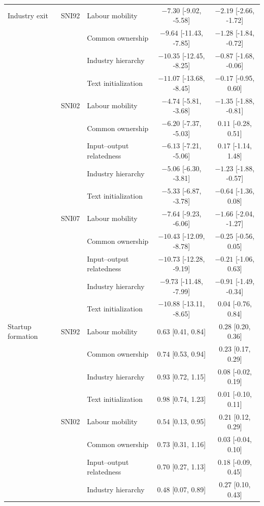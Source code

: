 \begin{table}[htbp]
\begin{tabular}{lllcc}
\midrule
Industry exit & SNI92 & Labour mobility & $-7.30$ [-9.02, -5.58] & $-2.19$ [-2.66, -1.72] \\
 &  & Common ownership & $-9.64$ [-11.43, -7.85] & $-1.28$ [-1.84, -0.72] \\
 &  & Industry hierarchy & $-10.35$ [-12.45, -8.25] & $-0.87$ [-1.68, -0.06] \\
 &  & Text initialization & $-11.07$ [-13.68, -8.45] & $-0.17$ [-0.95, 0.60] \\
\addlinespace[2pt]
 & SNI02 & Labour mobility & $-4.74$ [-5.81, -3.68] & $-1.35$ [-1.88, -0.81] \\
 &  & Common ownership & $-6.20$ [-7.37, -5.03] & $0.11$ [-0.28, 0.51] \\
 &  & Input--output relatedness & $-6.13$ [-7.21, -5.06] & $0.17$ [-1.14, 1.48] \\
 &  & Industry hierarchy & $-5.06$ [-6.30, -3.81] & $-1.23$ [-1.88, -0.57] \\
 &  & Text initialization & $-5.33$ [-6.87, -3.78] & $-0.64$ [-1.36, 0.08] \\
\addlinespace[2pt]
 & SNI07 & Labour mobility & $-7.64$ [-9.23, -6.06] & $-1.66$ [-2.04, -1.27] \\
 &  & Common ownership & $-10.43$ [-12.09, -8.78] & $-0.25$ [-0.56, 0.05] \\
 &  & Input--output relatedness & $-10.73$ [-12.28, -9.19] & $-0.21$ [-1.06, 0.63] \\
 &  & Industry hierarchy & $-9.73$ [-11.48, -7.99] & $-0.91$ [-1.49, -0.34] \\
 &  & Text initialization & $-10.88$ [-13.11, -8.65] & $0.04$ [-0.76, 0.84] \\
\midrule
Startup formation & SNI92 & Labour mobility & $0.63$ [0.41, 0.84] & $0.28$ [0.20, 0.36] \\
 &  & Common ownership & $0.74$ [0.53, 0.94] & $0.23$ [0.17, 0.29] \\
 &  & Industry hierarchy & $0.93$ [0.72, 1.15] & $0.08$ [-0.02, 0.19] \\
 &  & Text initialization & $0.98$ [0.74, 1.23] & $0.01$ [-0.10, 0.11] \\
\addlinespace[2pt]
 & SNI02 & Labour mobility & $0.54$ [0.13, 0.95] & $0.21$ [0.12, 0.29] \\
 &  & Common ownership & $0.73$ [0.31, 1.16] & $0.03$ [-0.04, 0.10] \\
 &  & Input--output relatedness & $0.70$ [0.27, 1.13] & $0.18$ [-0.09, 0.45] \\
 &  & Industry hierarchy & $0.48$ [0.07, 0.89] & $0.27$ [0.10, 0.43] \\

\end{tabular}
\end{table}
